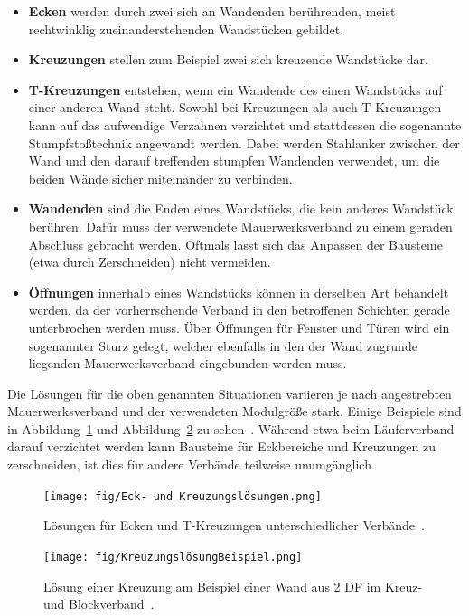 \begin{itemize}
  \item \textbf{Ecken} werden durch zwei sich an Wandenden berührenden, meist rechtwinklig zueinanderstehenden Wandstücken gebildet.
  \item \textbf{Kreuzungen} stellen zum Beispiel zwei sich kreuzende Wandstücke dar.
  \item \textbf{T-Kreuzungen} entstehen, wenn ein Wandende des einen Wandstücks auf einer anderen Wand steht.
  Sowohl bei Kreuzungen als auch T-Kreuzungen kann auf das aufwendige Verzahnen verzichtet und stattdessen die sogenannte Stumpfstoßtechnik angewandt werden.
  Dabei werden Stahlanker zwischen der Wand und den darauf treffenden \glqq{}stumpfen\grqq{} Wandenden verwendet, um die beiden Wände sicher miteinander zu verbinden.
  \item \textbf{Wandenden} sind die \glqq{}Enden\grqq{} eines Wandstücks, die kein anderes Wandstück berühren.
  Dafür muss der verwendete Mauerwerksverband zu einem geraden Abschluss gebracht werden.
  Oftmals lässt sich das Anpassen der Bausteine (etwa durch Zerschneiden) nicht vermeiden.
  \item \textbf{Öffnungen} innerhalb eines Wandstücks können in derselben Art behandelt werden, da der vorherrschende Verband in den betroffenen Schichten gerade unterbrochen werden muss.
  Über Öffnungen für Fenster und Türen wird ein sogenannter Sturz gelegt, welcher ebenfalls in den der Wand zugrunde liegenden Mauerwerksverband eingebunden werden muss.  
\end{itemize}
Die Lösungen für die oben genannten Situationen variieren je nach angestrebten Mauerwerksverband und der verwendeten Modulgröße stark.
Einige Beispiele sind in Abbildung~\ref{fig:basics:mauerwerk_eckloesung} und Abbildung~\ref{fig:basics:Kreuzungsloesung} zu sehen~\cite{Moro2021}\cite{MaurerfibelKreuzungen:online}.
Während etwa beim Läuferverband darauf verzichtet werden kann Bausteine für Eckbereiche und Kreuzungen zu zerschneiden, ist dies für andere Verbände teilweise unumgänglich. 

\begin{figure}[h]
  \centering
  \texttt{[image: fig/Eck- und Kreuzungslösungen.png]}
  \caption{Lösungen für Ecken und T-Kreuzungen unterschiedlicher Verbände~\cite{Moro2021}.}\label{fig:basics:mauerwerk_eckloesung}
\end{figure}

\begin{figure}[h]
  \centering
  \texttt{[image: fig/KreuzungslösungBeispiel.png]}
  \caption{Lösung einer Kreuzung am Beispiel einer \glqq{}Wand aus 2 DF im Kreuz- und Blockverband\grqq{}~\cite{MaurerfibelKreuzungen:online}.}\label{fig:basics:Kreuzungsloesung}
\end{figure}

